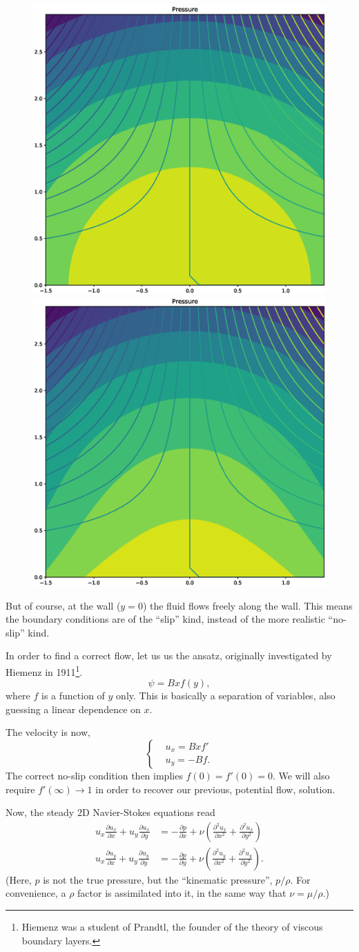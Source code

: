 \begin{figure}
  \centering
  \includegraphics[width=0.4\linewidth]{figures/stagnation_potential_streamlines}
  \includegraphics[width=0.4\linewidth]{figures/stagnation_viscous_streamlines}
  \caption{\label{fig:stagnation_streamlines}}
\end{figure}

But of course, at the wall ($y=0$) the fluid flows freely along the
wall. This means the boundary conditions are of the ``slip'' kind,
instead of the more realistic ``no-slip'' kind.

In order to find a correct flow, let us us the ansatz, originally
investigated by Hiemenz in 1911\footnote{%
  Hiemenz was a student of Prandtl, the founder of the theory of
  viscous boundary layers.
}.
  \[
\psi = B x f(y) ,
\]
where $f$ is a function of $y$ only. This is basically a separation of
variables, also guessing a linear dependence on $x$.

The velocity is now,
\[
\begin{cases}
  & u_x =   B x f' \\
  & u_y = - B f .
\end{cases}
\]
The correct no-slip condition then implies $f(0)=f'(0)=0$. We will
also require $f'(\infty)\to 1$ in order to recover our previous,
potential flow, solution.

Now, the steady 2D Navier-Stokes equations read
\begin{align}
  u_x  \frac{\partial u_x}{\partial x} +
  u_y  \frac{\partial u_x}{\partial y} 
  & =   - \frac{\partial p}{\partial x} +
  \nu
  \left(
  \frac{\partial^2 u_x}{\partial x^2} +
  \frac{\partial^2 u_x}{\partial y^2}
  \right) \\
  u_x  \frac{\partial u_y}{\partial x} +
  u_y  \frac{\partial u_y}{\partial y} 
  & =   - \frac{\partial p}{\partial y} +
  \nu
  \left(
  \frac{\partial^2 u_y}{\partial x^2} +
  \frac{\partial^2 u_y}{\partial y^2}
  \right) .
\end{align}
(Here, $p$ is not the true pressure, but the ``kinematic pressure'',
$p/\rho$. For convenience, a $\rho$ factor is assimilated into it, in
the same way that $\nu=\mu/\rho$.)

